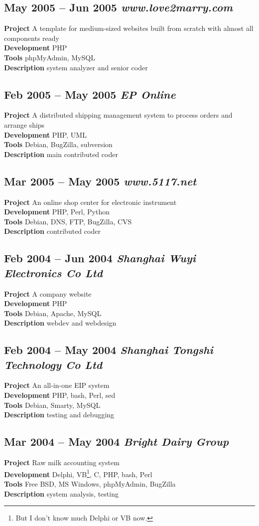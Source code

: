 \documentclass[a4paper,12pt]{article}
\newcommand{\company}[1]{%
  \textsl{#1}}
\newcommand{\itembf}[1]{%
  \textbf{\textcolor{bfcolor}{#1}}}
\newcommand{\ssubsection}[1]{%
  \subsection[#1]{\normalsize\textbf #1}}
\begin{document}
	\ssubsection{May 2005 -- Jun 2005 \company{www.love2marry.com}}
		\itembf{Project} A template for medium-sized websites built from scratch with almost all components ready\\
		\itembf{Development} PHP\\
		\itembf{Tools} phpMyAdmin, MySQL\\
		\itembf{Description} system analyzer and senior coder

	\ssubsection{Feb 2005 -- May 2005 \company{EP Online}}
		\itembf{Project} A distributed shipping management system to process orders and arrange ships\\
		\itembf{Development} PHP, UML\\
		\itembf{Tools} Debian, BugZilla, subversion\\
		\itembf{Description} main contributed coder

	\ssubsection{Mar 2005 -- May 2005 \company{www.5117.net}}
		\itembf{Project} An online shop center for electronic instrument\\
		\itembf{Development} PHP, Perl, Python\\
		\itembf{Tools} Debian, DNS, FTP, BugZilla, CVS\\
		\itembf{Description} contributed coder

	\ssubsection{Feb 2004 -- Jun 2004 \company{Shanghai Wuyi Electronics Co Ltd}}
		\itembf{Project} A company website\\
		\itembf{Development} PHP\\
		\itembf{Tools} Debian, Apache, MySQL\\
		\itembf{Description} webdev and webdesign

	\ssubsection{Feb 2004 -- May 2004 \company{Shanghai Tongshi Technology Co Ltd}}
		\itembf{Project} An all-in-one EIP system\\
		\itembf{Development} PHP, bash, Perl, sed\\
		\itembf{Tools} Debian, Smarty, MySQL\\
		\itembf{Description} testing and debugging

	\ssubsection{Mar 2004 -- May 2004 \company{Bright Dairy Group}}
		\itembf{Project} Raw milk accounting system\\
		\itembf{Development} Delphi, VB\footnote{But I don't know much Delphi or VB now.}, C, PHP, bash, Perl\\
		\itembf{Tools} Free BSD, MS Windows, phpMyAdmin, BugZilla\\
		\itembf{Description} system analysis, testing
\end{document}
